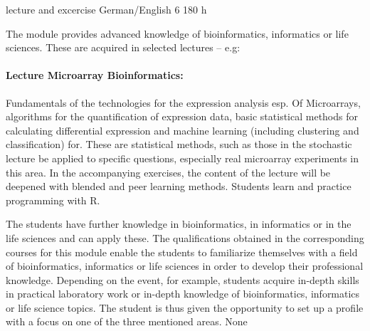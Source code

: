 {lecture and excercise}
{German/English}
{6}
{180 h}
{The module provides advanced knowledge of bioinformatics, informatics or life sciences. These are acquired in selected lectures -- e.g:
\paragraph{Lecture Microarray Bioinformatics:} Fundamentals of the technologies for the expression analysis esp. Of Microarrays, algorithms for the
quantification of expression data, basic statistical methods for calculating differential
expression and machine learning (including clustering and classification) for. These are statistical methods, such as those in the stochastic lecture
be applied to specific questions, especially real microarray experiments in this area.
In the accompanying exercises, the content of the lecture will be deepened with blended and peer learning methods.
Students learn and practice programming with R.}
{The students have further knowledge in bioinformatics, in informatics or in the life sciences and can apply these. The qualifications obtained in the corresponding courses for this module enable the students to familiarize themselves with a field of bioinformatics, informatics or life sciences in order to develop their professional knowledge. Depending on the event, for example, students acquire in-depth skills in practical laboratory work or in-depth knowledge of bioinformatics, informatics or life science topics. The student is thus given the opportunity to set up a profile with a focus on one of the three mentioned areas.
}
{None}